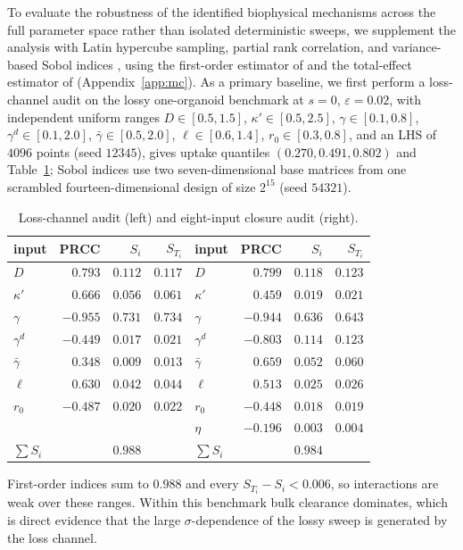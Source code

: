 \documentclass[pdflatex,sn-mathphys-num]{sn-jnl}
\numberwithin{equation}{section}
\theoremstyle{thmstyleone}%
\theoremstyle{definition}
\theoremstyle{remark}
\begin{document}
To evaluate the robustness of the identified biophysical mechanisms across the full parameter space rather than isolated deterministic sweeps, we supplement the analysis with Latin hypercube sampling, partial rank correlation, and variance-based Sobol indices \cite{mckay2000comparison,sobol2001global,marino2008methodology}, using the
first-order estimator of \cite{saltelli2010variance} and the total-effect
estimator of \cite{jansen1999analysis} (Appendix~\ref{app:mc}). As a primary baseline, we first perform a loss-channel audit on the lossy one-organoid benchmark at $s=0$, $\varepsilon=0.02$, with independent uniform ranges $D\in[0.5,1.5]$, $\kappa'\in[0.5,2.5]$, $\gamma\in[0.1,0.8]$,
$\gamma^d\in[0.1,2.0]$, $\bar\gamma\in[0.5,2.0]$, $\ell\in[0.6,1.4]$,
$r_0\in[0.3,0.8]$, and an LHS of $4096$ points (seed $12345$), gives uptake
quantiles $(0.270,0.491,0.802)$ and Table~\ref{tab:sens}; Sobol indices use two seven-dimensional base matrices from one scrambled fourteen-dimensional design of size $2^{15}$ (seed $54321$).

\begin{table}[htbp]\centering\small
\caption{Loss-channel audit (left) and eight-input closure audit (right).}
\label{tab:sens}
\begin{tabular}{@{}lrrr@{\hskip 2em}lrrr@{}}
\toprule
input&PRCC&$S_i$&$S_{T_i}$&input&PRCC&$S_i$&$S_{T_i}$\\
\midrule
$D$&$0.793$&$0.112$&$0.117$        &$D$&$0.799$&$0.118$&$0.123$\\
$\kappa'$&$0.666$&$0.056$&$0.061$  &$\kappa'$&$0.459$&$0.019$&$0.021$\\
$\gamma$&$-0.955$&$0.731$&$0.734$  &$\gamma$&$-0.944$&$0.636$&$0.643$\\
$\gamma^d$&$-0.449$&$0.017$&$0.021$&$\gamma^d$&$-0.803$&$0.114$&$0.123$\\
$\bar\gamma$&$0.348$&$0.009$&$0.013$&$\bar\gamma$&$0.659$&$0.052$&$0.060$\\
$\ell$&$0.630$&$0.042$&$0.044$     &$\ell$&$0.513$&$0.025$&$0.026$\\
$r_0$&$-0.487$&$0.020$&$0.022$     &$r_0$&$-0.448$&$0.018$&$0.019$\\
&&&                                 &$\eta$&$-0.196$&$0.003$&$0.004$\\
\midrule
$\sum S_i$&&$0.988$&                &$\sum S_i$&&$0.984$&\\
\bottomrule
\end{tabular}
\end{table}

First-order indices sum to $0.988$ and every $S_{T_i}-S_i<0.006$, so
interactions are weak over these ranges. Within this benchmark bulk clearance
dominates, which is direct evidence that the large $\sigma$-dependence of the
lossy sweep is generated by the loss channel.
\end{document}
